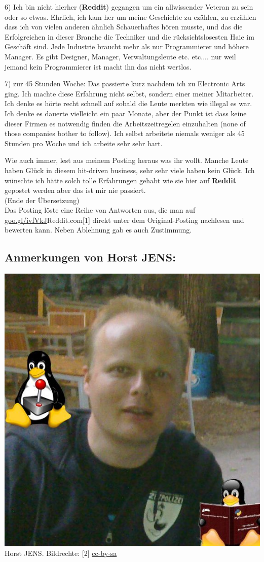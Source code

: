 \documentclass[10pt,a4paper,ngerman,twoside]{article} %
\begin{document}
\begin{multicols}{3}
6) Ich bin nicht hierher (\textbf{Reddit}) gegangen um ein allwissender Veteran zu sein oder so etwas. Ehrlich, ich kam her um meine Geschichte zu ezählen, zu erzählen dass ich von vielen anderen ähnlich Schauerhaftes hören musste, und das die Erfolgreichen in dieser Branche die Techniker und die rücksichtslosesten Haie im Geschäft sind. Jede Industrie braucht mehr als nur Programmierer und höhere Manager. Es gibt Designer, Manager, Verwaltungsleute etc. etc.... nur weil jemand kein Programmierer ist macht ihn das nicht wertlos.
 
7) zur 45 Stunden Woche: Das passierte kurz nachdem ich zu Electronic Arts ging. Ich machte diese Erfahrung nicht selbst, sondern einer meiner Mitarbeiter. Ich denke es hörte recht schnell auf sobald die Leute merkten wie illegal es war. Ich denke es dauerte vielleicht ein paar Monate, aber der Punkt ist dass keine dieser Firmen es notwendig finden die Arbeitszeitregelen einzuhalten (none of those companies bother to follow). Ich selbst arbeitete niemals weniger als 45 Stunden pro Woche und ich arbeite sehr sehr hart. 

Wie auch immer, lest aus meinem Posting heraus was ihr wollt. Manche Leute haben Glück in diesem hit-driven business, sehr sehr viele haben kein Glück. Ich wünschte ich hätte solch tolle Erfahrungen gehabt wie sie hier auf \textbf{Reddit} gepostet werden aber das ist mir nie passiert. \\

(Ende der Übersetzung) \\

Das Posting löste eine Reihe von Antworten aus, die man auf \href{http://www.reddit.com/r/gamedev/comments/z83h2/the_games_industry_is_a_scam_and_this_is_why_you}{goo.gl/ivfVkJ}{Reddit.com}[1] direkt unter dem Original-Posting nachlesen und bewerten kann. Neben Ablehnung gab es auch Zustimmung.

\subsection*{Anmerkungen von Horst JENS:}
\begin{center}
\includegraphics[width=0.6\linewidth]{redditrant/horst2011mitdoppeltux.jpg} \\
\footnotesize{Horst JENS. Bildrechte: [2] \href{http://creativecommons.org/licenses/by-sa/4.0/deed.de}{cc-by-sa}}
\end{center}


\end{multicols}
\end{document}
